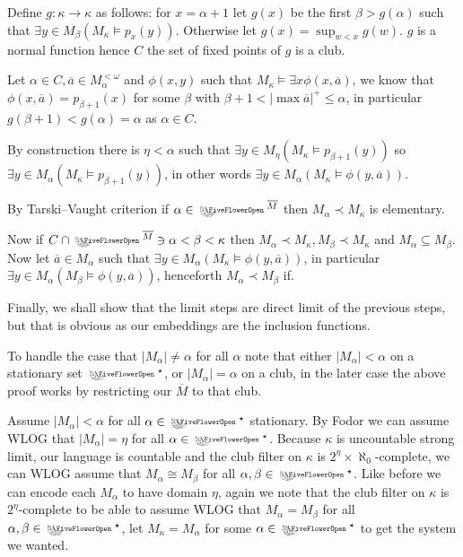 \begin{cExercise}
\begin{cPart}
		Define $g:\kappa\to\kappa$ as follows: for $x=\alpha+1$ let $g(x)$ be the first $\beta>g(\alpha)$ such that $\exists y\in M_\beta(M_\kappa\models p_x(y))$. Otherwise let $g(x)=\sup_{w<x}g(w)$. $g$ is a normal function hence $C$ the set of fixed points of $g$ is a club.
		
		Let $\alpha\in C, \overline a\in M_\alpha^{<\omega}$ and $\phi(x,y)$ such that $M_\kappa\models \exists x\phi(x,\overline a)$, we know that $\phi(x,\overline a)=p_{\beta+1}(x)$ for some $\beta$ with $\beta + 1<|\max \overline a|^+\le\alpha$, in particular $g(\beta+1)<g(\alpha)=\alpha$ as $\alpha\in C$.
		
		By construction there is $\eta<\alpha$ such that $\exists y\in M_\eta(M_\kappa\models p_{\beta+1}(y))$ so $\exists y\in M_\alpha(M_\kappa\models p_{\beta+1}(y))$, in other words $\exists y\in M_\alpha(M_\kappa\models \phi(y, \overline a))$.
		
		By Tarski–Vaught criterion if $\alpha\in\flower^{\overline{M}}$ then $M_\alpha\prec M_\kappa$ is elementary.
		
		Now if $C\cap\flower^{\overline{M}}\ni\alpha<\beta<\kappa$ then $M_\alpha\prec M_\kappa, M_\beta\prec M_\kappa$ and $M_\alpha\subseteq M_\beta$. Now let $\overline a\in M_\alpha$ such that $\exists y\in M_\alpha(M_\kappa\models \phi(y, \overline a))$, in particular $\exists y\in M_\alpha(M_\beta\models \phi(y, \overline a))$, henceforth $M_\alpha\prec M_\beta$ if.
		
		
		Finally, we shall show that the limit steps are direct limit of the previous steps, but that is obvious as our embeddings are the inclusion functions.
		
		To handle the case that $|M_\alpha|\ne\alpha$ for all $\alpha$ note that either $|M_\alpha|<\alpha$ on a stationary set $\flower^\star$, or $|M_\alpha|=\alpha$ on a club, in the later case the above proof works by restricting our $\overline M$ to that club.
		
		Assume $|M_\alpha|<\alpha$ for all $\alpha\in\flower^\star$ stationary. By Fodor we can assume WLOG that $|M_\alpha|=\eta$ for all $\alpha\in \flower^\star$. Because $\kappa$ is uncountable strong limit, our language is countable and the club filter on $\kappa$ is $2^\eta\times\aleph_0$-complete, we can WLOG assume that $M_\alpha\cong M_\beta$ for all $\alpha,\beta\in\flower^\star$. Like  before we can encode each $M_\alpha$ to have domain $\eta$, again we note that the club filter on $\kappa$ is $2^\eta$-complete to be able to assume WLOG that $M_\alpha=M_\beta$ for all $\alpha,\beta\in\flower^\star$, let $M_\kappa=M_\alpha$ for some $\alpha\in\flower^\star$ to get the system we wanted. 
	\end{cPart}
\end{cExercise}
